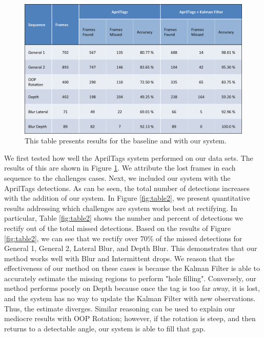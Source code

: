 \documentclass[letterpaper,10pt,conference]{IEEEtran}
\begin{document}
\begin{figure}
\centering
\includegraphics[scale=.4]{table1}
\caption{This table presents results for the baseline and with our system.}
\label{fig:table1}
\end{figure}

We first tested how well the AprilTags system performed on our data sets. The results of this are shown in Figure \ref{fig:table1}. We attribute the lost frames in each sequence to the challenges cases. Next, we included our system with the AprilTags detections. As can be seen, the total number of detections increases with the addition of our system. In Figure \ref{fig:table2}, we present quantitative results addressing which challenges are system works best at rectifying. In particular, Table \ref{fig:table2} shows the number and percent of detections we rectify out of the total missed detections. Based on the results of Figure \ref{fig:table2}, we can see that we rectify over 70\% of the missed detections for General 1, General 2, Lateral Blur, and Depth Blur. This demonstrates that our method works well with Blur and Intermittent drops. We reason that the effectiveness of our method on these cases is because the Kalman Filter is able to accurately estimate the missing regions to perform "hole filling". Conversely, our method performs poorly on Depth because once the tag is too far away, it is lost, and the system has no way to update the Kalman Filter with new observations. Thus, the estimate diverges. Similar reasoning can be used to explain our mediocre results with OOP Rotation; however, if the rotation is steep, and then returns to a detectable angle, our system is able to fill that gap.
\end{document}
